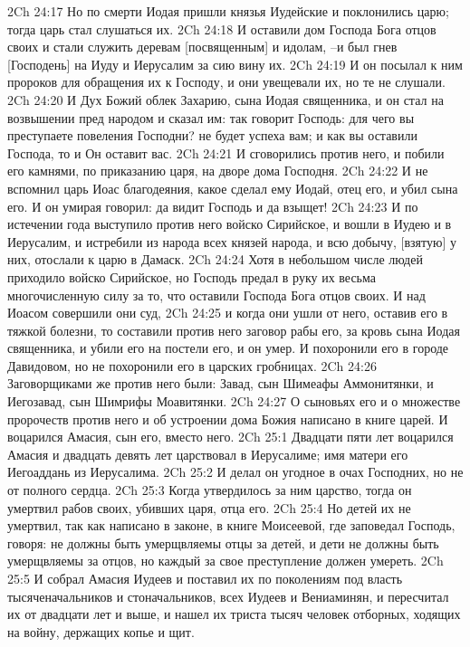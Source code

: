 2Ch 24:17  Но по смерти Иодая пришли князья Иудейские и поклонились царю; тогда царь стал слушаться их.
2Ch 24:18  И оставили дом Господа Бога отцов своих и стали служить деревам [посвященным] и идолам, --и был гнев [Господень] на Иуду и Иерусалим за сию вину их.
2Ch 24:19  И он посылал к ним пророков для обращения их к Господу, и они увещевали их, но те не слушали.
2Ch 24:20  И Дух Божий облек Захарию, сына Иодая священника, и он стал на возвышении пред народом и сказал им: так говорит Господь: для чего вы преступаете повеления Господни? не будет успеха вам; и как вы оставили Господа, то и Он оставит вас.
2Ch 24:21  И сговорились против него, и побили его камнями, по приказанию царя, на дворе дома Господня.
2Ch 24:22  И не вспомнил царь Иоас благодеяния, какое сделал ему Иодай, отец его, и убил сына его. И он умирая говорил: да видит Господь и да взыщет!
2Ch 24:23  И по истечении года выступило против него войско Сирийское, и вошли в Иудею и в Иерусалим, и истребили из народа всех князей народа, и всю добычу, [взятую] у них, отослали к царю в Дамаск.
2Ch 24:24  Хотя в небольшом числе людей приходило войско Сирийское, но Господь предал в руку их весьма многочисленную силу за то, что оставили Господа Бога отцов своих. И над Иоасом совершили они суд,
2Ch 24:25  и когда они ушли от него, оставив его в тяжкой болезни, то составили против него заговор рабы его, за кровь сына Иодая священника, и убили его на постели его, и он умер. И похоронили его в городе Давидовом, но не похоронили его в царских гробницах.
2Ch 24:26  Заговорщиками же против него были: Завад, сын Шимеафы Аммонитянки, и Иегозавад, сын Шимрифы Моавитянки.
2Ch 24:27  О сыновьях его и о множестве пророчеств против него и об устроении дома Божия написано в книге царей. И воцарился Амасия, сын его, вместо него.
2Ch 25:1  Двадцати пяти лет воцарился Амасия и двадцать девять лет царствовал в Иерусалиме; имя матери его Иегоаддань из Иерусалима.
2Ch 25:2  И делал он угодное в очах Господних, но не от полного сердца.
2Ch 25:3  Когда утвердилось за ним царство, тогда он умертвил рабов своих, убивших царя, отца его.
2Ch 25:4  Но детей их не умертвил, так как написано в законе, в книге Моисеевой, где заповедал Господь, говоря: не должны быть умерщвляемы отцы за детей, и дети не должны быть умерщвляемы за отцов, но каждый за свое преступление должен умереть.
2Ch 25:5  И собрал Амасия Иудеев и поставил их по поколениям под власть тысяченачальников и стоначальников, всех Иудеев и Вениаминян, и пересчитал их от двадцати лет и выше, и нашел их триста тысяч человек отборных, ходящих на войну, держащих копье и щит.
